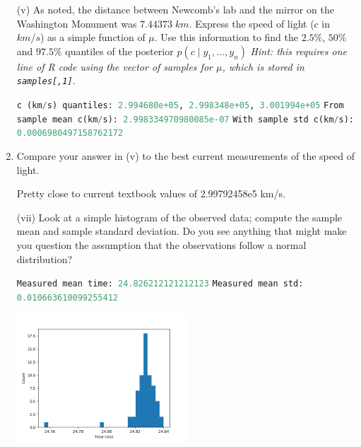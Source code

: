 \documentclass{article}
\newcommand{\1}{\mathbf{1}}
\begin{document}
\begin{enumerate}
\begin{enumerate}
        \lstinline[language=Python]{sigma_phi^2 25th 50th and 97.5th qunatiles: [0.1058339  0.12416121 0.14878844]}
    
        \item[(v)] As noted, the distance between Newcomb's lab and the mirror on the Washington Monument was $7.44373\; km$. Express the speed of light ($c$ in $km/s$) as a simple function of $\mu$. Use this information to find the $2.5\%$, $50\%$ and $97.5\%$ quantiles of the posterior $p(c \mid y_1,\ldots ,y_n)$ {\it Hint: this requires one line of R code using the vector of samples for $\mu$, which is stored in {\tt samples[,1]}.}
        
         \lstinline[language=Python]{c (km/s) quantiles: 2.994680e+05, 2.998348e+05, 3.001994e+05} \newline
         \lstinline[language=Python]{From sample mean c(km/s): 2.998334970980085e-07} \newline
        \lstinline[language=Python]{With sample std c(km/s): 0.0006980497158762172} 
    
        \item[(vi)] Compare your answer in (v) to the best current measurements of the speed of light. 
        
        Pretty close to current textbook values of 2.99792458e5 km/s.
    
        \item[(vii)] Look at a simple histogram of the observed data; compute the sample mean and sample standard deviation. Do you see anything that might make you question the assumption that the observations follow a normal distribution?
    
         \lstinline[language=Python]{Measured mean time: 24.826212121212123}\newline
         \lstinline[language=Python]{Measured mean std: 0.010663610099255412}
    
        \begin{center} 
            \includegraphics[width=0.5\textwidth]{STATS509/HW6/HW6Figures/problem5bvii.png}
        \end{center}
        

\end{enumerate}
\end{enumerate}
\end{document}
